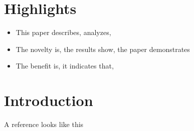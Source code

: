 \documentclass[a4paper,5p,review]{elsarticle}
\begin{document}



\section*{\textbf{Highlights}}

\begin{itemize}
    \item This paper describes, analyzes, 
    \item The novelty is, the results show, the paper demonstrates
    \item The benefit is, it indicates that, 
\end{itemize}

\section{Introduction}
\label{sec:Introduction}

A reference looks like this \cite{negahbani2020pathonet}




\end{document}
